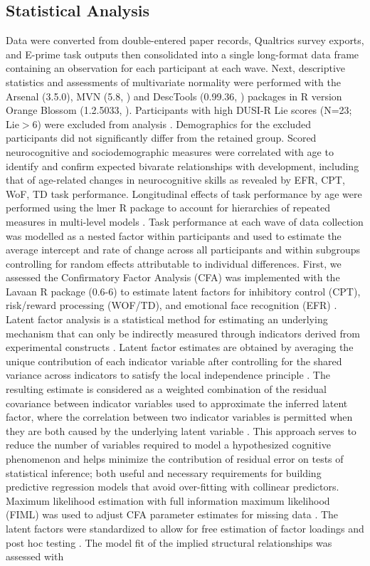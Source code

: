 \documentclass{article}%
\begin{document}
\subsection*{Statistical Analysis} Data were converted from double-entered paper records, Qualtrics survey exports, and E-prime task outputs then consolidated into a single long-format data frame containing an observation for each participant at each wave. Next, descriptive statistics and assessments of multivariate normality were performed with the Arsenal (3.5.0), MVN (5.8, \cite{MVN}) and DescTools (0.99.36, \cite{DescTools}) packages in R version Orange Blossom (1.2.5033, \cite{R}). Participants with high DUSI-R Lie scores (N=23; Lie$>6$) were excluded from analysis \citep{dalla2003effects}. Demographics for the excluded participants did not significantly differ from the retained group. Scored neurocognitive and sociodemographic measures were correlated with age to identify and confirm expected bivarate relationships with development, including that of age-related changes in neurocognitive skills as revealed by EFR, CPT, WoF, TD task performance. Longitudinal effects of task performance by age were performed using the lmer R package to account for hierarchies of repeated measures in multi-level models \citep{lmer}. Task performance at each wave of data collection was modelled as a nested factor within participants and used to estimate the average intercept and rate of change across all participants and within subgroups controlling for random effects attributable to individual differences. First, we assessed the Confirmatory Factor Analysis (CFA) was implemented with the Lavaan R package (0.6-6) to estimate latent factors for inhibitory control (CPT), risk/reward processing (WOF/TD), and emotional face recognition (EFR) \citep{Lavaan}. Latent factor analysis is a statistical method for estimating an underlying mechanism that can only be indirectly measured through indicators derived from experimental constructs \citep{finch2015latent}. Latent factor estimates are obtained by averaging the unique contribution of each indicator variable after controlling for the shared variance across indicators to satisfy the local independence principle \citep{sobel1997measurement}. The resulting estimate is considered as a weighted combination of the residual covariance between indicator variables used to approximate the inferred latent factor, where the correlation between two indicator variables is permitted when they are both caused by the underlying latent variable \citep{cooper2019neuroimaging}. This approach serves to reduce the number of variables required to model a hypothesized cognitive phenomenon and helps minimize the contribution of residual error on tests of statistical inference; both useful and necessary requirements for building predictive regression models that avoid over-fitting with collinear predictors. Maximum likelihood estimation with full information maximum likelihood (FIML) was used to adjust CFA parameter estimates for missing data \citep{cham2017full}. The latent factors were standardized to allow for free estimation of factor loadings and post hoc testing \citep{HuTzeBentler1998}. The model fit of the implied structural relationships was assessed with 
\end{document}
